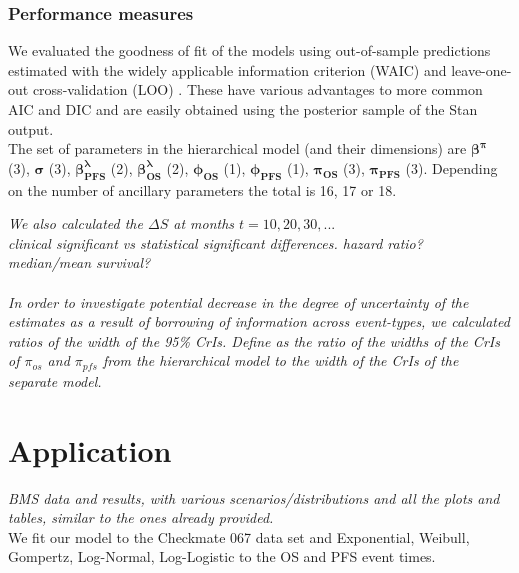 \documentclass[AMA,STIX1COL]{WileyNJD-v2}
\begin{document}
\subsubsection{Performance measures}
We evaluated the goodness of fit of the models using out-of-sample predictions estimated with the widely applicable information criterion (WAIC) and leave-one-out cross-validation (LOO) \cite{Vehtari2017}.
These have various advantages to more common AIC and DIC and are easily obtained using the posterior sample of the Stan output.\\
The set of parameters in the hierarchical model (and their dimensions) are
$\mathbf{\beta^{\pi}}$ (3), $\mathbf{\sigma}$ (3), $\mathbf{\beta^{\lambda}_{PFS}}$ (2), $\mathbf{\beta^{\lambda}_{OS}}$ (2), $\mathbf{\phi_{OS}}$ (1), $\mathbf{\phi_{PFS}}$ (1), $\mathbf{\pi_{OS}}$ (3), $\mathbf{\pi_{PFS}}$ (3).
Depending on the number of ancillary parameters the total is 16, 17 or 18.

{\it We also calculated the 
$\Delta S$ at months $t = 10, 20, 30, ...$\\
clinical significant vs statistical significant differences.
hazard ratio?\\
median/mean survival?}\\
\\
{\it In order to investigate potential decrease in the degree of uncertainty of the estimates as a result of borrowing of information across event-types, we calculated ratios of the width of the 95\% CrIs.
Define as the ratio of the widths of the CrIs of $\pi_{os}$ and $\pi_{pfs}$ from the hierarchical model to the width of the CrIs of the separate model.}


\section{Application}\label{sec:application}

{\it BMS data and results, with various scenarios/distributions and all the plots and tables, similar to the ones already provided.}\\
We fit our model to the Checkmate 067 data set and Exponential, Weibull, Gompertz, Log-Normal, Log-Logistic to the OS and PFS event times.\\
\end{document}
